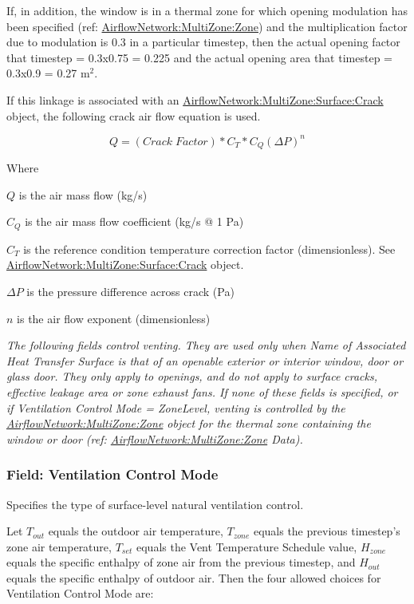 If, in addition, the window is in a thermal zone for which opening modulation has been specified (ref: \hyperref[airflownetworkmultizonezone]{AirflowNetwork:MultiZone:Zone}) and the multiplication factor due to modulation is 0.3 in a particular timestep, then the actual opening factor that timestep = 0.3x0.75 = 0.225 and the actual opening area that timestep = 0.3x0.9 = 0.27 m\(^{2}\).

If this linkage is associated with an \hyperref[airflownetworkmultizonesurfacecrack]{AirflowNetwork:MultiZone:Surface:Crack} object, the following crack air flow equation is used.

\begin{equation}
Q = \left( Crack\;Factor \right) * C_T * C_Q \left( \Delta P \right)^{n}
\end{equation}

Where

$Q$ is the air mass flow (kg/s)

$C_Q$ is the air mass flow coefficient (kg/s @ 1 Pa)

$C_T$ is the reference condition temperature correction factor (dimensionless). See \hyperref[airflownetworkmultizonesurfacecrack]{AirflowNetwork:MultiZone:Surface:Crack} object.

$\Delta P$ is the pressure difference across crack (Pa)

$n$ is the air flow exponent (dimensionless)

\emph{The following fields control venting. They are used only when Name of Associated Heat Transfer Surface is that of an openable exterior or interior window, door or glass door. They only apply to openings, and do not apply to surface cracks, effective leakage area or zone exhaust fans. If none of these fields is specified, or if Ventilation Control Mode = ZoneLevel, venting is controlled by the \hyperref[airflownetworkmultizonezone]{AirflowNetwork:MultiZone:Zone} object for the thermal zone containing the window or door (ref: \hyperref[airflownetworkmultizonezone]{AirflowNetwork:MultiZone:Zone} Data).}

\subsubsection{Field: Ventilation Control Mode}\label{field-ventilation-control-mode-1}

Specifies the type of surface-level natural ventilation control.

Let $T_{out}$ equals the outdoor air temperature, $T_{zone}$ equals the previous
timestep's zone air temperature, $T_{set}$ equals the Vent Temperature Schedule
value, $H_{zone}$ equals the specific enthalpy of zone air from the previous
timestep, and $H_{out}$ equals the specific enthalpy of outdoor air. Then the
four allowed choices for Ventilation Control Mode are:

